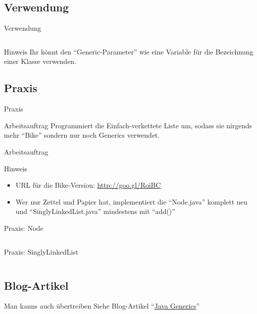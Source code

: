 \documentclass[usepdftitle=false,hyperref={pdfpagelabels=false}]{beamer}
\begin{document}
\subsection{Verwendung}
\begin{frame}{Verwendung}
    \inputminted[linenos=true, numbersep=5pt, tabsize=4, fontsize=\small]{java}{Generics-singleLines.java}
    \begin{block}{Hinweis}
        Ihr könnt den "`Generic-Parameter"' wie eine Variable für die
        Bezeichnung einer Klasse verwenden.
    \end{block}
\end{frame}

\subsection{Praxis}
\begin{frame}{Praxis}
    \begin{block}{Arbeitsauftrag}
        Programmiert die Einfach-verkettete Liste um, sodass sie
        nirgends mehr "`Bike"' sondern nur noch Generics verwendet.
    \end{block}{Arbeitsauftrag}

    \begin{exampleblock}{Hinweis}
        \begin{itemize}
          \item URL für die Bike-Version: \href{http://goo.gl/RoiBC}{http://goo.gl/RoiBC}
          \item Wer nur Zettel und Papier hat, implementiert die "`Node.java"'
                komplett neu und "`SinglyLinkedList.java"' mindestens mit "`add()"'
        \end{itemize}
    \end{exampleblock}
\end{frame}

\begin{frame}{Praxis: Node}
    \inputminted[linenos=true, numbersep=5pt, tabsize=4, fontsize=\tiny]{java}{SinglyLinkedList-Result/Node.java}
\end{frame}

\begin{frame}{Praxis: SinglyLinkedList}
    \inputminted[linenos=true, numbersep=5pt, tabsize=4, fontsize=\small, firstnumber=1, firstline=1, lastline=13]{java}{SinglyLinkedList-Result/SinglyLinkedList.java}
\end{frame}

\subsection{Blog-Artikel}
\begin{frame}{Man kanns auch übertreiben}
    Siehe Blog-Artikel "`\href{http://martin-thoma.com/java-generics/}{Java Generics}"'
\end{frame}
\end{document}
